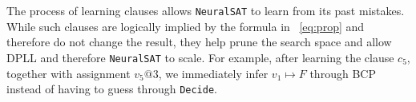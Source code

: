 \documentclass[oneside,11pt,dvipsnames]{book}
\numberwithin{equation}{section}
\theoremstyle{definition}
\theoremstyle{remark}
\newcommand{\tool}{\texttt{NeuralSAT}}
\begin{document}
The process of learning clauses allows \tool{} to learn from its past mistakes.
While such clauses are logically implied by the formula in ~\autoref{eq:prop} and therefore do not change the result, they help prune the search space and allow DPLL and therefore \tool{} to scale. For example, after learning the clause $c_5$, together with assignment $v_5@3$, we immediately infer $v_1 \mapsto F$ through BCP instead of having to guess through \texttt{Decide}.







\end{document}
